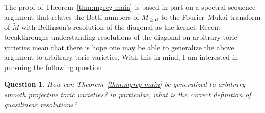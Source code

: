 \documentclass[11pt,reqno]{amsart}
\newtheorem{question}[lemma]{Question}
\theoremstyle{remark}
\newcommand{\Tor}{\operatorname{Tor}}
\renewcommand{\aa}{\mathbf a}
\newcommand{\dd}{\mathbf d}
\newcommand{\nn}{\mathbf n}
\renewcommand{\O}{\mathcal{O}}
\newcommand{\C}{\mathbb{C}}
\renewcommand{\P}{\mathbb{P}}
\newcommand{\Z}{\mathbb{Z}}
\begin{document}
The proof of Theorem~\ref{thm:mgreg-main} is based in part on a spectral sequence argument that relates the Betti numbers of $M_{\geq\dd}$ to the Fourier--Mukai transform of $\widetilde{M}$ with Beilinson's resolution of the diagonal as the kernel.  Recent breakthroughs \cite{HHL23, brownErman23-2} understanding resolutions of the diagonal on arbitrary toric varieties mean that there is hope one may be able to generalize the above argument to arbitrary toric varieties. With this in mind, I am interested in pursuing the following question


\begin{question}
How can Theorem~\ref{thm:mgreg-main} be generalized to arbitrary smooth projective toric varieties? in particular, what is the correct definition of quasilinear resolutions?
\end{question}

%
%
%
%
\end{document}
